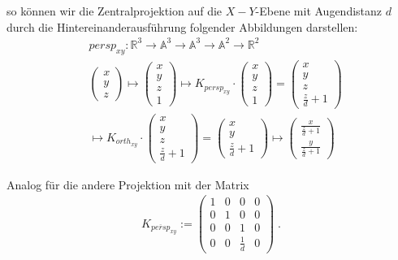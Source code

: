so können wir die Zentralprojektion auf die $X-Y$-Ebene mit Augendistanz $d$ durch die Hintereinanderausführung folgender Abbildungen darstellen:
\begin{align*}
& persp_{xy} :\mathbb{R}^3   \to \mathbb{A}^3    \to  \mathbb{A}^3    \to \mathbb{A}^2    \to \mathbb{R}^2  \\
&\begin{pmatrix} x \\ y \\ z \end{pmatrix} \mapsto \begin{pmatrix} x \\ y \\ z \\ 1 \end{pmatrix}   \mapsto K_{persp_{xy}} \cdot  \begin{pmatrix} x \\ y \\ z \\ 1 \end{pmatrix} =   \begin{pmatrix} x \\ y \\ z \\ \frac{z}{d} + 1 \end{pmatrix} \\
 & \mapsto K_{orth_{xy}} \cdot   \begin{pmatrix} x \\ y \\ z \\ \frac{z}{d} + 1 \end{pmatrix}=   \begin{pmatrix} x \\ y \\ \frac{z}{d} + 1 \end{pmatrix}   \mapsto 
 \begin{pmatrix}  \frac{x}{\frac{z}{d} +1 } \\   \frac{y}{\frac{z}{d} +1 } \end{pmatrix}
 \end{align*}

Analog für die andere Projektion mit der Matrix
\begin{align*}
K_{\overline{persp}_{xy}} := \begin{pmatrix}  
1   &  0 & 0 & 0  \\
0   &  1 & 0 & 0  \\
0   &  0 & 1 & 0  \\
0   &  0 & \frac{1}{d} & 0  
\end{pmatrix}  \; .
\end{align*}


